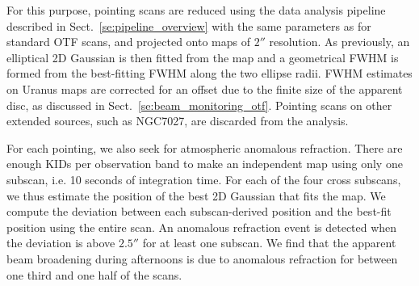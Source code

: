 For this purpose, pointing scans are reduced using
the data analysis pipeline described in
Sect.~\ref{se:pipeline_overview} with the same parameters as for
standard OTF scans, and projected onto maps of $2''$ resolution.
As previously, an elliptical 2D Gaussian is then fitted from the map
and a geometrical FWHM is formed from the best-fitting FWHM along the
two ellipse radii. FWHM estimates on Uranus maps are corrected for an
offset due to the finite size of the apparent disc, as discussed in
Sect.~\ref{se:beam_monitoring_otf}. Pointing scans on other extended
sources, such as NGC7027, are discarded from the analysis.

For each pointing, we also seek for atmospheric anomalous refraction. There are
enough KIDs per observation band to make an independent map using only
one subscan, i.e. 10 seconds of integration time.
For each of the four cross subscans, we thus estimate the position of the best
2D Gaussian that fits the map. We compute the deviation between each
subscan-derived position and the best-fit position using the entire
scan. An anomalous refraction event is detected when the deviation is
above $2.5''$ for at least one subscan. We find that the apparent beam
broadening during afternoons is due to anomalous refraction for
between one third and one half of the scans.%

